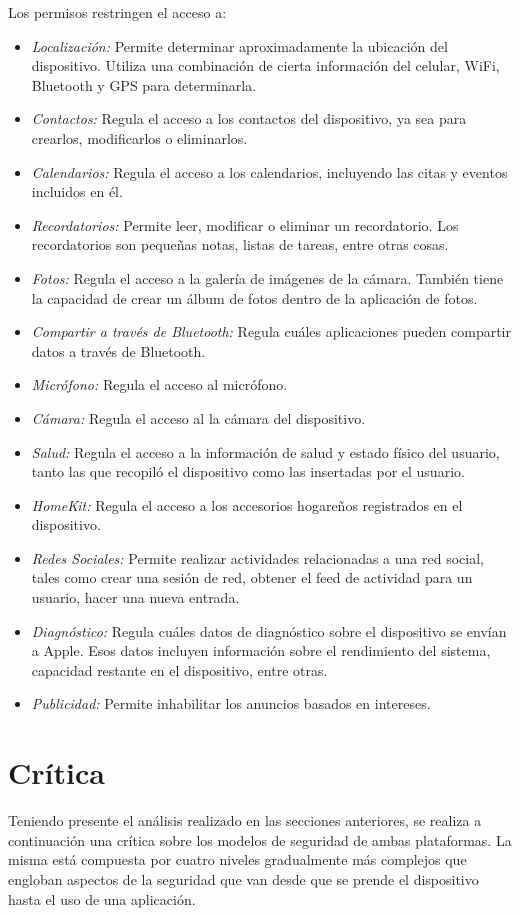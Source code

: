 Los permisos restringen el acceso a:
\begin{itemize}
	\item \emph{Localización:} Permite determinar aproximadamente la ubicación del dispositivo. Utiliza una combinación de cierta información del celular, WiFi, Bluetooth y GPS para determinarla.
	\item \emph{Contactos:} Regula el acceso a los contactos del dispositivo, ya sea para crearlos, modificarlos o eliminarlos.
	\item \emph{Calendarios:} Regula el acceso a los calendarios, incluyendo las citas y eventos incluidos en él.
	\item \emph{Recordatorios:} Permite leer, modificar o eliminar un recordatorio. Los recordatorios son pequeñas notas, listas de tareas, entre otras cosas.
	\item \emph{Fotos:} Regula el acceso a la galería de imágenes de la cámara. También tiene la capacidad de crear un álbum de fotos dentro de la aplicación de fotos.
	\item \emph{Compartir a través de Bluetooth:} Regula cuáles aplicaciones pueden compartir datos a través de Bluetooth.
	\item \emph{Micrófono:} Regula el acceso al micrófono.
	\item \emph{Cámara:} Regula el acceso al la cámara del dispositivo.
	\item \emph{Salud:} Regula el acceso a la información de salud y estado físico del usuario, tanto las que recopiló el dispositivo como las insertadas por el usuario.
	\item \emph{HomeKit:} Regula el acceso a los accesorios hogareños registrados en el dispositivo.			
	\item \emph{Redes Sociales:} Permite realizar actividades relacionadas a una red social, tales como crear una sesión de red, obtener el feed de actividad para un usuario, hacer una nueva entrada.
	\item \emph{Diagnóstico:} Regula cuáles datos de diagnóstico sobre el dispositivo se envían a Apple. Esos datos incluyen información sobre el rendimiento del sistema, capacidad restante en el dispositivo, entre otras.
	\item \emph{Publicidad:} Permite inhabilitar los anuncios basados en intereses.
\end{itemize}
\section{Crítica}
Teniendo presente el análisis realizado en las secciones anteriores, se realiza a continuación una crítica sobre los modelos de seguridad de ambas plataformas. La misma está compuesta por cuatro niveles gradualmente más complejos que engloban aspectos de la seguridad que van desde que se prende el dispositivo hasta el uso de una aplicación.
